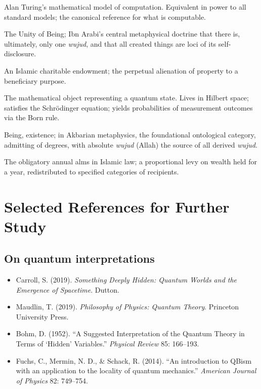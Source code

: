 \documentclass[11pt,a4paper]{book}
\theoremstyle{cleanrm}
\begin{document}
\begin{description}[leftmargin=3.5cm,style=nextline]
\item[Turing machine] Alan Turing's mathematical model of
computation. Equivalent in power to all standard models; the
canonical reference for what is computable.

\item[\emph{Wahdat al-wujud}] The Unity of Being; Ibn Arabi's central
metaphysical doctrine that there is, ultimately, only one
\emph{wujud}, and that all created things are loci of its
self-disclosure.

\item[\emph{Waqf}] An Islamic charitable endowment; the perpetual
alienation of property to a beneficiary purpose.

\item[Wave function] The mathematical object representing a quantum
state. Lives in Hilbert space; satisfies the Schr\"odinger equation;
yields probabilities of measurement outcomes via the Born rule.

\item[\emph{Wujud}] Being, existence; in Akbarian metaphysics, the
foundational ontological category, admitting of degrees, with
absolute \emph{wujud} (Allah) the source of all derived
\emph{wujud}.

\item[\emph{Zakat}] The obligatory annual alms in Islamic law; a
proportional levy on wealth held for a year, redistributed to
specified categories of recipients.

\end{description}

\chapter*{Selected References for Further Study}

\section*{On quantum interpretations}
\begin{itemize}[leftmargin=2em]
    \item Carroll, S. (2019). \emph{Something Deeply Hidden: Quantum
    Worlds and the Emergence of Spacetime}. Dutton.
    \item Maudlin, T. (2019). \emph{Philosophy of Physics: Quantum
    Theory}. Princeton University Press.
    \item Bohm, D. (1952). ``A Suggested Interpretation of the
    Quantum Theory in Terms of `Hidden' Variables.'' \emph{Physical
    Review} 85: 166--193.
    \item Fuchs, C., Mermin, N. D., \& Schack, R. (2014). ``An
    introduction to QBism with an application to the locality of
    quantum mechanics.'' \emph{American Journal of Physics} 82:
    749--754.
\end{itemize}
\end{document}
